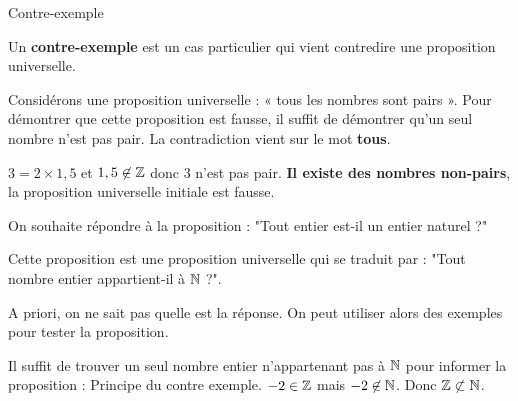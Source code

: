 \begin{pageCours}
\begin{Rq}

\end{Rq}
 
\begin{DefT}{Contre-exemple}

Un \textbf{contre-exemple} est un cas particulier qui vient contredire une proposition universelle. 

\end{DefT}
 

\begin{Ex} 

Considérons une proposition universelle : « tous les nombres sont pairs ». Pour démontrer que cette proposition est fausse, il suffit de démontrer qu'un seul nombre n'est pas pair. La contradiction vient sur le mot \textbf{tous}.

$3=2\times1,5$ et $1,5 \not\in\mathbb Z$ donc $3$ n'est pas pair. \textbf{Il existe
  des nombres non-pairs}, la proposition universelle initiale est fausse. 

\end{Ex}
 

\begin{LogT}{On souhaite répondre à la proposition : "Tout entier est-il un entier naturel ?"  }

Cette proposition est une proposition universelle qui se traduit par : "Tout nombre entier appartient-il à $\mathbb N$ ?". 

A priori, on ne sait pas quelle est la réponse. On peut utiliser alors des exemples pour tester la proposition.

Il suffit de trouver un seul nombre entier n'appartenant pas à $\mathbb N$ pour informer la proposition : Principe du contre exemple. 
$-2 \in \mathbb Z$ mais $-2 \not \in \mathbb N$. Donc $\mathbb Z \not \subset \mathbb N$.

\end{LogT}


\end{pageCours} 
